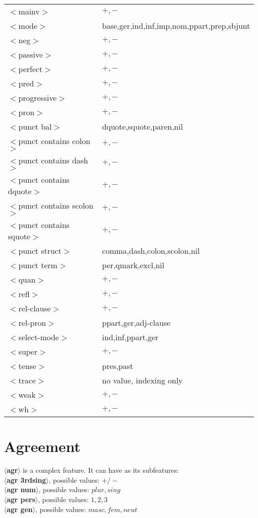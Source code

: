 \begin{table}[htbp]
\begin{tabular}{|l|l|}
$<$mainv$>$&$+,-$\\ 
$<$mode$>$&base,ger,ind,inf,imp,nom,ppart,prep,sbjunt\\ 
$<$neg$>$&$+,-$\\ 
$<$passive$>$&$+,-$\\ 
$<$perfect$>$&$+,-$\\ 
$<$pred$>$&$+,-$\\ 
$<$progressive$>$&$+,-$\\ 
$<$pron$>$&$+,-$\\ 
$<$punct bal$>$&dquote,squote,paren,nil\\ 
$<$punct contains colon$>$&$+,-$\\ 
$<$punct contains dash$>$&$+,-$\\ 
$<$punct contains dquote$>$&$+,-$\\ 
$<$punct contains scolon$>$&$+,-$\\ 
$<$punct contains squote$>$&$+,-$\\ 
$<$punct struct$>$&comma,dash,colon,scolon,nil\\ 
$<$punct term$>$&per,qmark,excl,nil\\ 
$<$quan$>$&$+,-$\\ 
$<$refl$>$&$+,-$\\ 
$<$rel-clause$>$&$+,-$\\ 
$<$rel-pron$>$&ppart,ger,adj-clause\\ 
$<$select-mode$>$&ind,inf,ppart,ger\\ 
$<$super$>$&$+,-$\\ 
$<$tense$>$&pres,past\\ 
$<$trace$>$&no value, indexing only\\ 
$<$weak$>$&$+,-$\\ 
$<$wh$>$&$+,-$\\ 
\hline 
\end{tabular} 
\begin{rawhtml} <dl> <dt>{List of features and their possible values <p> </dl> \end{rawhtml}
\label{feature-table} 
\end{table} 
 
\normalsize 
 
 
\section{Agreement} 
{\bf $\langle$agr$\rangle$} is a complex feature. 
It can have as its subfeatures:\\ 
{\bf $\langle$agr 3rdsing$\rangle$}, possible values: {\bf $+/-$ }\\ 
{\bf $\langle$agr num$\rangle$}, possible values: {\bf $plur,sing$ }\\ 
{\bf $\langle$agr pers$\rangle$}, possible values: {\bf $1,2,3$ }\\ 
{\bf $\langle$agr gen$\rangle$}, possible values: {\bf $masc,fem,neut$ } 
 
